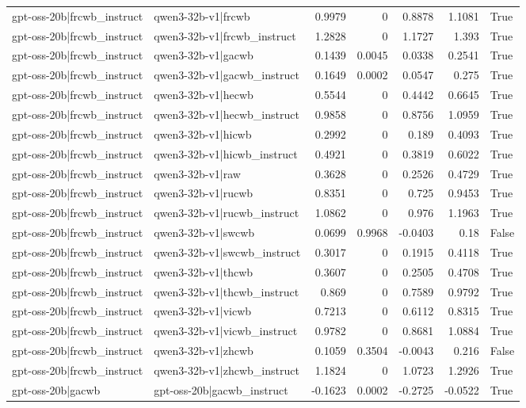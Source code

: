 \begin{table}
\begin{tabular}{l l r r r r l}
gpt-oss-20b|frcwb_instruct & qwen3-32b-v1|frcwb & 0.9979 & 0 & 0.8878 & 1.1081 & True \\
gpt-oss-20b|frcwb_instruct & qwen3-32b-v1|frcwb_instruct & 1.2828 & 0 & 1.1727 & 1.393 & True \\
gpt-oss-20b|frcwb_instruct & qwen3-32b-v1|gacwb & 0.1439 & 0.0045 & 0.0338 & 0.2541 & True \\
gpt-oss-20b|frcwb_instruct & qwen3-32b-v1|gacwb_instruct & 0.1649 & 0.0002 & 0.0547 & 0.275 & True \\
gpt-oss-20b|frcwb_instruct & qwen3-32b-v1|hecwb & 0.5544 & 0 & 0.4442 & 0.6645 & True \\
gpt-oss-20b|frcwb_instruct & qwen3-32b-v1|hecwb_instruct & 0.9858 & 0 & 0.8756 & 1.0959 & True \\
gpt-oss-20b|frcwb_instruct & qwen3-32b-v1|hicwb & 0.2992 & 0 & 0.189 & 0.4093 & True \\
gpt-oss-20b|frcwb_instruct & qwen3-32b-v1|hicwb_instruct & 0.4921 & 0 & 0.3819 & 0.6022 & True \\
gpt-oss-20b|frcwb_instruct & qwen3-32b-v1|raw & 0.3628 & 0 & 0.2526 & 0.4729 & True \\
gpt-oss-20b|frcwb_instruct & qwen3-32b-v1|rucwb & 0.8351 & 0 & 0.725 & 0.9453 & True \\
gpt-oss-20b|frcwb_instruct & qwen3-32b-v1|rucwb_instruct & 1.0862 & 0 & 0.976 & 1.1963 & True \\
gpt-oss-20b|frcwb_instruct & qwen3-32b-v1|swcwb & 0.0699 & 0.9968 & -0.0403 & 0.18 & False \\
gpt-oss-20b|frcwb_instruct & qwen3-32b-v1|swcwb_instruct & 0.3017 & 0 & 0.1915 & 0.4118 & True \\
gpt-oss-20b|frcwb_instruct & qwen3-32b-v1|thcwb & 0.3607 & 0 & 0.2505 & 0.4708 & True \\
gpt-oss-20b|frcwb_instruct & qwen3-32b-v1|thcwb_instruct & 0.869 & 0 & 0.7589 & 0.9792 & True \\
gpt-oss-20b|frcwb_instruct & qwen3-32b-v1|vicwb & 0.7213 & 0 & 0.6112 & 0.8315 & True \\
gpt-oss-20b|frcwb_instruct & qwen3-32b-v1|vicwb_instruct & 0.9782 & 0 & 0.8681 & 1.0884 & True \\
gpt-oss-20b|frcwb_instruct & qwen3-32b-v1|zhcwb & 0.1059 & 0.3504 & -0.0043 & 0.216 & False \\
gpt-oss-20b|frcwb_instruct & qwen3-32b-v1|zhcwb_instruct & 1.1824 & 0 & 1.0723 & 1.2926 & True \\
gpt-oss-20b|gacwb & gpt-oss-20b|gacwb_instruct & -0.1623 & 0.0002 & -0.2725 & -0.0522 & True \\

\end{tabular}
\end{table}
